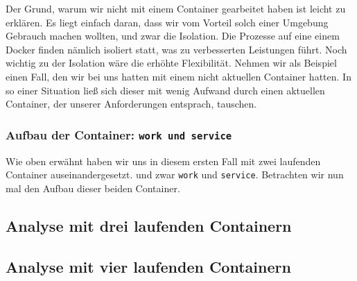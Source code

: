 Der Grund, warum wir nicht mit einem Container gearbeitet haben ist leicht zu erklären. Es liegt einfach daran, dass wir vom Vorteil solch einer Umgebung Gebrauch machen wollten, und zwar die Isolation. Die Prozesse auf eine einem Docker finden nämlich isoliert statt, was zu verbesserten Leistungen führt. Noch wichtig zu der Isolation wäre die erhöhte Flexibilität. Nehmen wir als Beispiel einen Fall, den wir bei uns hatten mit einem nicht aktuellen Container hatten. In so einer Situation ließ sich dieser mit wenig Aufwand durch einen aktuellen Container, der unserer Anforderungen entsprach, tauschen.\\

\subsubsection{Aufbau der Container: \texttt{work und service}}

Wie oben erwähnt haben wir uns in diesem ersten Fall mit zwei laufenden Container auseinandergesetzt. und zwar \texttt{work} und \texttt{service}. Betrachten wir nun mal den Aufbau dieser beiden Container.



\subsection{Analyse mit drei laufenden Containern}

\subsection{Analyse mit vier laufenden Containern}
